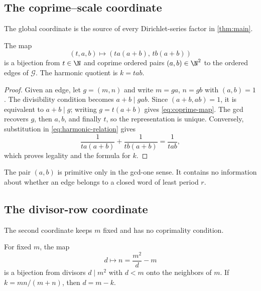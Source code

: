 \subsection{The coprime--scale coordinate}

The global coordinate is the source of every Dirichlet-series factor in
\cref{thm:main}.

\begin{proposition}
\label{prop:coprime-coordinate}
The map
\begin{equation}
 (t,a,b)\longmapsto
 (t a(a+b),\,t b(a+b))
 \label{eq:coprime-map}
\end{equation}
is a bijection from $t\in\N$ and coprime ordered pairs $(a,b)\in\N^2$ to
the ordered edges of $\mathcal G$.  The harmonic quotient is $k=tab$.
\end{proposition}

\begin{proof}
Given an edge, let $g=(m,n)$ and write $m=ga$, $n=gb$ with $(a,b)=1$.
The divisibility condition becomes $a+b\mid gab$.  Since
$(a+b,ab)=1$, it is equivalent to $a+b\mid g$; writing $g=t(a+b)$ gives
\eqref{eq:coprime-map}.  The gcd recovers $g$, then $a,b$, and finally $t$,
so the representation is unique.  Conversely, substitution in
\eqref{eq:harmonic-relation} gives
\[
  \frac1{t a(a+b)}+\frac1{t b(a+b)}=\frac1{tab},
\]
which proves legality and the formula for $k$.
\end{proof}

The pair $(a,b)$ is primitive only in the gcd-one sense.  It contains no
information about whether an edge belongs to a closed word of least period
$r$.

\subsection{The divisor-row coordinate}

The second coordinate keeps $m$ fixed and has no coprimality condition.

\begin{proposition}
\label{prop:divisor-row}
For fixed $m$, the map
\begin{equation}
 d\longmapsto n=\frac{m^2}{d}-m
 \label{eq:divisor-map}
\end{equation}
is a bijection from divisors $d\mid m^2$ with $d<m$ onto the neighbors of
$m$.  If $k=mn/(m+n)$, then $d=m-k$.
\end{proposition}

